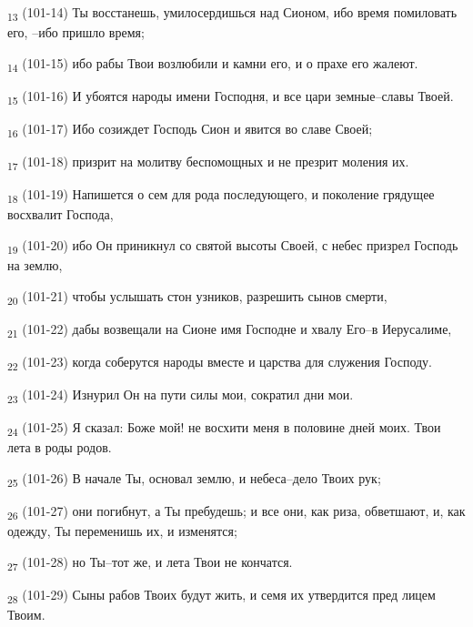 \begin{tcolorbox}
\textsubscript{13} (101-14) Ты восстанешь, умилосердишься над Сионом, ибо время помиловать его, --ибо пришло время;
\end{tcolorbox}
\begin{tcolorbox}
\textsubscript{14} (101-15) ибо рабы Твои возлюбили и камни его, и о прахе его жалеют.
\end{tcolorbox}
\begin{tcolorbox}
\textsubscript{15} (101-16) И убоятся народы имени Господня, и все цари земные--славы Твоей.
\end{tcolorbox}
\begin{tcolorbox}
\textsubscript{16} (101-17) Ибо созиждет Господь Сион и явится во славе Своей;
\end{tcolorbox}
\begin{tcolorbox}
\textsubscript{17} (101-18) призрит на молитву беспомощных и не презрит моления их.
\end{tcolorbox}
\begin{tcolorbox}
\textsubscript{18} (101-19) Напишется о сем для рода последующего, и поколение грядущее восхвалит Господа,
\end{tcolorbox}
\begin{tcolorbox}
\textsubscript{19} (101-20) ибо Он приникнул со святой высоты Своей, с небес призрел Господь на землю,
\end{tcolorbox}
\begin{tcolorbox}
\textsubscript{20} (101-21) чтобы услышать стон узников, разрешить сынов смерти,
\end{tcolorbox}
\begin{tcolorbox}
\textsubscript{21} (101-22) дабы возвещали на Сионе имя Господне и хвалу Его--в Иерусалиме,
\end{tcolorbox}
\begin{tcolorbox}
\textsubscript{22} (101-23) когда соберутся народы вместе и царства для служения Господу.
\end{tcolorbox}
\begin{tcolorbox}
\textsubscript{23} (101-24) Изнурил Он на пути силы мои, сократил дни мои.
\end{tcolorbox}
\begin{tcolorbox}
\textsubscript{24} (101-25) Я сказал: Боже мой! не восхити меня в половине дней моих. Твои лета в роды родов.
\end{tcolorbox}
\begin{tcolorbox}
\textsubscript{25} (101-26) В начале Ты, основал землю, и небеса--дело Твоих рук;
\end{tcolorbox}
\begin{tcolorbox}
\textsubscript{26} (101-27) они погибнут, а Ты пребудешь; и все они, как риза, обветшают, и, как одежду, Ты переменишь их, и изменятся;
\end{tcolorbox}
\begin{tcolorbox}
\textsubscript{27} (101-28) но Ты--тот же, и лета Твои не кончатся.
\end{tcolorbox}
\begin{tcolorbox}
\textsubscript{28} (101-29) Сыны рабов Твоих будут жить, и семя их утвердится пред лицем Твоим.
\end{tcolorbox}
